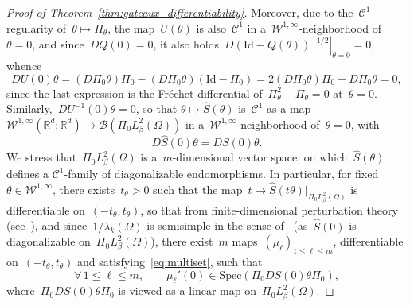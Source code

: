 \documentclass[a4]{article}
\newcommand{\R}{\mathbb{R}}
\newcommand{\1}{\mathbbm 1}
\newcommand{\Winf}{{{\cW}^{1,\infty}}}
\newcommand{\Id}{\mathrm{Id}}
\newcommand{\cW}{\mathcal{W}}
\begin{document}
\begin{proof}[Proof of Theorem~\ref{thm:gateaux_differentiability}]
    Moreover, due to the~$\mathcal C^1$ regularity of~$\theta\mapsto \Pi_\theta$, the map~$U(\theta)$ is also~$\mathcal C^1$ in a~$\Winf$-neighborhood of~$\theta=0$, and since~$DQ(0)= 0$, it also holds~$\left.D(\Id-Q(\theta))^{-1/2}\right|_{\theta=0}=0$, whence
    \[D U(0)\theta = \left(D\Pi_0\theta\right)\Pi_0 - \left(D\Pi_0\theta\right)(\Id - \Pi_0) = 2\left(D\Pi_0\theta\right)\Pi_0 - D\Pi_0\theta = 0,\]
    since the last expression is the Fréchet differential of~$\Pi_\theta^2-\Pi_\theta=0$ at~$\theta=0$. Similarly,~$D U^{-1}(0)\theta=0$, so that
    $\theta\mapsto \widehat S(\theta)$ is~$\mathcal C^1$ as a map~$\Winf(\R^d;\R^d)\to\mathcal B({\Pi_0 L^2_\beta(\Omega)})$ in a~$\Winf$-neighborhood of~$\theta=0$, with
    \begin{equation}
        D\widehat{S}(0)\theta = D S(0)\theta.
    \end{equation}
    We stress that~$\Pi_0 L^2_\beta(\Omega)$ is a~$m$-dimensional vector space, on which~$\widehat S(\theta)$ defines a $\mathcal C^1$-family of diagonalizable endomorphisms.
    In particular, for fixed~$\theta\in \Winf$, there exists~$t_\theta>0$ such that the map~$t\mapsto \widehat S(t\theta)|_{{\Pi_0 L^2_\beta(\Omega)}}$ is differentiable on~$(-t_\theta,t_\theta)$, so that from finite-dimensional perturbation theory (see~\cite[Section II.5.4, Theorem 5.4 and Remark 5.5 and Section II.5.5, Theorem 5.6]{K13}), and since~$1/\lambda_k(\Omega)$ is semisimple in the sense of~\cite[Section I.4]{K13} (as~$\widehat S(0)$ is diagonalizable on~$\Pi_0 L_\beta^2(\Omega)$), there exist~$m$ maps~$\left(\mu_\ell\right)_{1\leq \ell\leq m}$, differentiable on~$(-t_\theta,t_\theta)$ and satisfying~\eqref{eq:multiset}, such that
    \begin{equation}
        \label{eq:gateaux_derivative_eigenvalue}
        \forall\,1\leq \ell\leq m,\qquad \mu_\ell'(0) \in \mathrm{Spec}\left(\Pi_0 D S(0) \theta \Pi_0\right),
    \end{equation}
    where~$\Pi_0 D S(0)\theta\Pi_0$ is viewed as a linear map on~${\Pi_0 L^2_\beta(\Omega)}$.

\end{proof}
\end{document}
